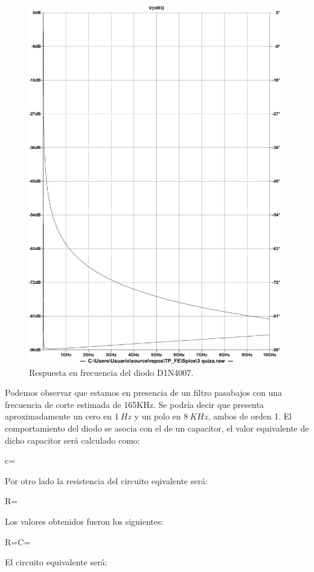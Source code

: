 \documentclass[a4paper]{article}
\begin{document}
\begin{figure}[H]
	\centering
	\includegraphics[width=0.99\textwidth]{RtaF3}	
	\caption{Respuesta en frecuencia del diodo D1N4007.}
	\label{fig:rtaf}
\end{figure}
Podemos observar que estamos en presencia de un filtro pasabajos con una frecuencia de corte estimada de 165KHz. Se podría decir que presenta aproximadamente un cero en $1 \ Hz$ y un polo en $8 \ KHz$, ambos de orden 1.
El comportamiento del diodo se asocia con el de un capacitor, el valor equivalente de dicho capacitor será calculado como:
\begin{center}
c=
\end{center}
Por otro lado la resistencia del circuito eqivalente será:
\begin{center}
R=
\end{center}
Los valores obtenidos fueron los siguientes:
\begin{center}
R=\tab C= 
\end{center}
El circuito equivalente será:
\end{document}
